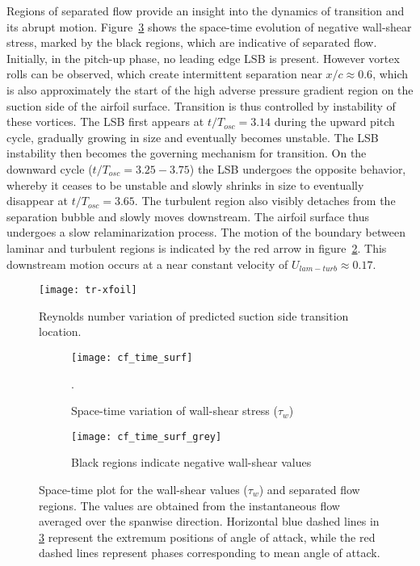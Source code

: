 \documentclass[twocolumn,10pt]{tsfp}
\begin{document}
Regions of separated flow provide an insight into the dynamics of transition and its abrupt motion. Figure~\ref{fig:separation-time} shows the space-time evolution of negative wall-shear stress, marked by the black regions, which are indicative of separated flow. Initially, in the pitch-up phase, no leading edge LSB is present. However vortex rolls can be observed, which create intermittent separation near $x/c\approx0.6$, which is also approximately the start of the high adverse pressure gradient region on the suction side of the airfoil surface. Transition is thus controlled by instability of these vortices. The LSB first appears at $t/T_{osc}=3.14$ during the upward pitch cycle, gradually growing in size and eventually becomes unstable. The LSB instability then becomes the governing mechanism for transition. On the downward cycle ($t/T_{osc}=3.25 - 3.75$) the LSB undergoes the opposite behavior, whereby it ceases to be unstable and slowly shrinks in size to eventually disappear at $t/T_{osc}=3.65$. The turbulent region also visibly detaches from the separation bubble and slowly moves downstream. The airfoil surface thus undergoes a slow relaminarization process. The motion of the boundary between laminar and turbulent regions is indicated by the red arrow in figure~\ref{fig:cf-time}. This downstream motion occurs at a near constant velocity of $U_{lam-turb}\approx0.17$. 
\begin{figure}[h]
	\centering
	\texttt{[image: tr-xfoil]}
	\caption{Reynolds number variation of predicted suction side transition location.}
	\label{fig:tr-xfoil}
\end{figure}
\begin{figure*}
	\centering
	\begin{subfigure}[t]{1\columnwidth}
		\centering
		\texttt{[image: cf\_time\_surf]}
		\caption{Space-time variation of wall-shear stress ($\tau_{w}$)}. 
		\label{fig:cf-time}
	\end{subfigure}
	\begin{subfigure}[t]{1\columnwidth}
		\centering
		\texttt{[image: cf\_time\_surf\_grey]}
		\caption{Black regions indicate negative wall-shear values} 
		\label{fig:separation-time}
	\end{subfigure}
	\caption{Space-time plot for the wall-shear values ($\tau_{w}$) and separated flow regions. The values are obtained from the instantaneous flow averaged over the spanwise direction. Horizontal blue dashed lines in \ref{fig:separation-time} represent the extremum positions of angle of attack, while the red dashed lines represent phases corresponding to mean angle of attack.}
	\label{fig:space-time}
\end{figure*}
\end{document}
